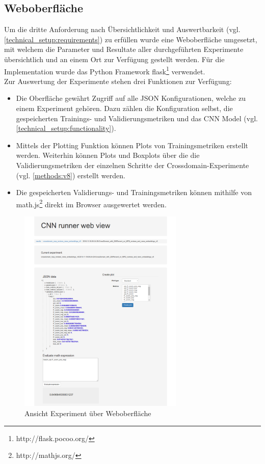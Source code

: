 \subsection{Weboberfläche}
\label{technical_setup:webgui}
Um die dritte Anforderung nach Übersichtlichkeit und Auswertbarkeit (vgl. \ref{technical_setup:requirements}) zu erfüllen wurde eine Weboberfläche umgesetzt, mit welchem die Parameter und Resultate aller durchgeführten Experimente übersichtlich und an einem Ort zur Verfügung gestellt werden. Für die Implementation wurde das Python Framework flask\footnote{http://flask.pocoo.org/} verwendet.\\
Zur Auswertung der Experimente stehen drei Funktionen zur Verfügung:
\begin{itemize}
	\item Die Oberfläche gewährt Zugriff auf alle JSON Konfigurationen, welche zu einem Experiment gehören. Dazu zählen die Konfiguration selbst, die gespeicherten Trainings- und Validierungsmetriken und das CNN Model (vgl. \ref{technical_setup:functionality}).
	\item Mittels der Plotting Funktion können Plots von Trainingsmetriken erstellt werden. Weiterhin können Plots und Boxplots über die die Validierungsmetriken der einzelnen Schritte der Crossdomain-Experimente (vgl. \ref{methods:v8}) erstellt werden.
	\item Die gespeicherten Validierungs- und Trainingsmetriken können mithilfe von math.js\footnote{http://mathjs.org/} direkt im Browser ausgewertet werden.
\end{itemize}
\begin{figure}[htbp]
	\centering
	\includegraphics[width=0.7\textwidth]{img/web_gui}
	\caption{Ansicht Experiment über Weboberfläche}
	\label{fig:web_gui}
\end{figure}
